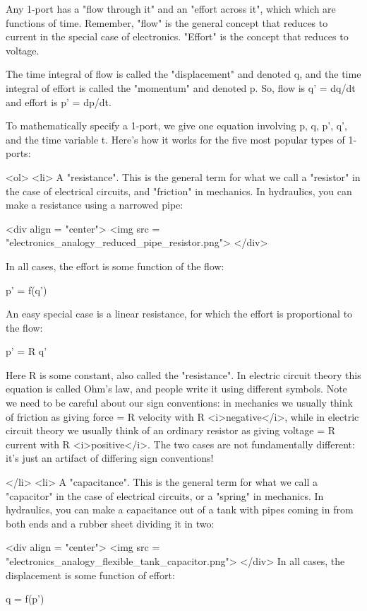 Any 1-port has a "flow through it" and an "effort
across it", which which are functions of time.  Remember,
"flow" is the general concept that reduces to current in the
special case of electronics.  "Effort" is the concept that
reduces to voltage.

The time integral of flow is called the "displacement" and
denoted q, and the time integral of effort is called the
"momentum" and denoted p.  So, flow is q' = dq/dt and effort
is p' = dp/dt.

To mathematically specify a 1-port, we give one equation involving p,
q, p', q', and the time variable t.  Here's how it works for the five
most popular types of 1-ports:

<ol>
<li> 
  A "resistance".  This is the general term for what we
  call a "resistor" in the case of electrical circuits, and
  "friction" in mechanics.  In hydraulics, you can make
  a resistance using a narrowed pipe:

<div align = "center">
<img src = "electronics_analogy_reduced_pipe_resistor.png">
</div>

In all cases, the effort is some function of the flow:

  p' = f(q')

  An easy special case is a linear resistance, for which the effort
  is proportional to the flow:

  p' = R q'

  Here R is some constant, also called the "resistance".  In
  electric circuit theory this equation is called Ohm's law, and
  people write it using different symbols.  Note we need to be careful
  about our sign conventions: in mechanics we usually think of
  friction as giving force = R velocity with R <i>negative</i>, while
  in electric circuit theory we usually think of an ordinary resistor
  as giving voltage = R current with R <i>positive</i>.  The two cases
  are not fundamentally different: it's just an artifact of differing
  sign conventions!

</li>
<li> A "capacitance".  This is the general term for what we
  call a "capacitor" in the case of electrical circuits, or
  a "spring" in mechanics.  In hydraulics, you can make a
  capacitance out of a tank with pipes coming in from both ends and a
  rubber sheet dividing it in two:

<div align = "center">
<img src = "electronics_analogy_flexible_tank_capacitor.png">
</div>
  In all cases, the displacement is some
  function of effort:

  q = f(p')

